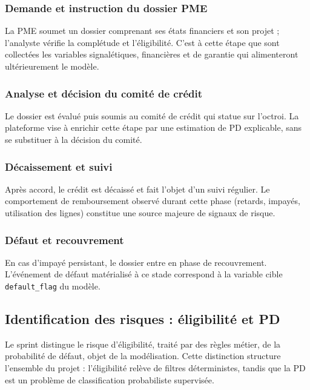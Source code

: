 \documentclass[a4paper,12pt,oneside]{report}
\begin{document}
\subsubsection{Demande et instruction du dossier PME}

La PME soumet un dossier comprenant ses états financiers et son projet ; l'analyste vérifie
la complétude et l'éligibilité. C'est à cette étape que sont collectées les variables
signalétiques, financières et de garantie qui alimenteront ultérieurement le modèle.

\subsubsection{Analyse et décision du comité de crédit}

Le dossier est évalué puis soumis au comité de crédit qui statue sur l'octroi. La plateforme
vise à enrichir cette étape par une estimation de PD explicable, sans se substituer à la
décision du comité.

\subsubsection{Décaissement et suivi}

Après accord, le crédit est décaissé et fait l'objet d'un suivi régulier. Le comportement de
remboursement observé durant cette phase (retards, impayés, utilisation des lignes) constitue
une source majeure de signaux de risque.

\subsubsection{Défaut et recouvrement}

En cas d'impayé persistant, le dossier entre en phase de recouvrement. L'événement de défaut
matérialisé à ce stade correspond à la variable cible \texttt{default\_flag} du modèle.

\subsection{Identification des risques : éligibilité et PD}

Le sprint distingue le risque d'éligibilité, traité par des règles métier, de la probabilité
de défaut, objet de la modélisation. Cette distinction structure l'ensemble du projet :
l'éligibilité relève de filtres déterministes, tandis que la PD est un problème de
classification probabiliste supervisée.
\end{document}
